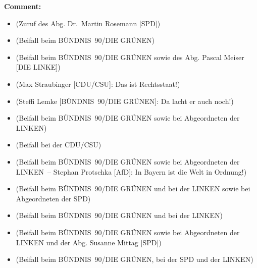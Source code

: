 \documentclass{article}
\begin{document}
\noindent\textbf{Comment:}
\begin{itemize}
    \setlength\itemsep{-3pt}
    \item (Zuruf des Abg. Dr. Martin Rosemann [SPD])
    \setlength\itemsep{-3pt}
    \item (Beifall beim BÜNDNIS 90/DIE GRÜNEN)
    \setlength\itemsep{-3pt}
    \item (Beifall beim BÜNDNIS 90/DIE GRÜNEN sowie des Abg. Pascal Meiser [DIE LINKE])
    \setlength\itemsep{-3pt}
    \item (Max Straubinger [CDU/CSU]: Das ist Rechtsstaat!)
    \setlength\itemsep{-3pt}
    \item (Steffi Lemke [BÜNDNIS 90/DIE GRÜNEN]: Da lacht er auch noch!)
    \setlength\itemsep{-3pt}
    \item (Beifall beim BÜNDNIS 90/DIE GRÜNEN sowie bei Abgeordneten der LINKEN)
    \setlength\itemsep{-3pt}
    \item (Beifall bei der CDU/CSU)
    \setlength\itemsep{-3pt}
    \item (Beifall beim BÜNDNIS 90/DIE GRÜNEN sowie bei Abgeordneten der LINKEN – Stephan Protschka [AfD]: In Bayern ist die Welt in Ordnung!)
    \setlength\itemsep{-3pt}
    \item (Beifall beim BÜNDNIS 90/DIE GRÜNEN und bei der LINKEN sowie bei Abgeordneten der SPD)
    \setlength\itemsep{-3pt}
    \item (Beifall beim BÜNDNIS 90/DIE GRÜNEN und bei der LINKEN)
    \setlength\itemsep{-3pt}
    \item (Beifall beim BÜNDNIS 90/DIE GRÜNEN sowie bei Abgeordneten der LINKEN und der Abg. Susanne Mittag [SPD])
    \setlength\itemsep{-3pt}
    \item (Beifall beim BÜNDNIS 90/DIE GRÜNEN, bei der SPD und der LINKEN)
\end{itemize}
\end{document}
